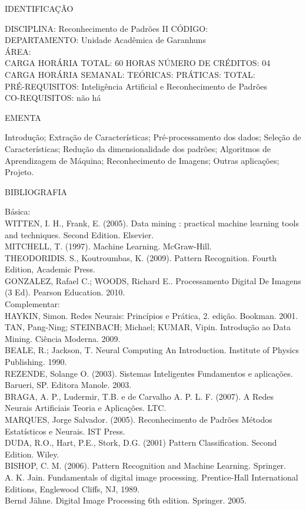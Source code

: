 \documentclass[
	12pt,				%
	openright,			%
  oneside,     %
	a4paper,			%
	chapter=TITLE,		%
	english,			%
	french,				%
	spanish,			%
	brazil				%
	]{abntex2}
\begin{document}
\begin{apendicesenv}
\newpage IDENTIFICAÇÃO

DISCIPLINA: Reconhecimento de Padrões II CÓDIGO:\\ 
DEPARTAMENTO: Unidade Acadêmica de Garanhuns\\
ÁREA: \\
CARGA HORÁRIA TOTAL: 60 HORAS NÚMERO DE CRÉDITOS: 04\\
CARGA HORÁRIA SEMANAL: TEÓRICAS: PRÁTICAS: TOTAL: \\
PRÉ-REQUISITOS: Inteligência Artificial e Reconhecimento de Padrões\\
CO-REQUISITOS: não há

EMENTA 

Introdução; Extração de Características; Pré-processamento dos dados; Seleção de Características; Redução da dimensionalidade dos padrões; Algoritmos de Aprendizagem de Máquina; Reconhecimento de Imagens; Outras aplicações; Projeto.

BIBLIOGRAFIA 

Básica:\\
WITTEN, I. H., Frank, E. (2005). Data mining : practical machine
learning tools and techniques. Second Edition. Elsevier.\\
MITCHELL, T. (1997). Machine Learning. McGraw-Hill.\\
THEODORIDIS. S., Koutroumbas, K. (2009). Pattern Recognition. Fourth
Edition, Academic Press.\\
GONZALEZ, Rafael C.; WOODS, Richard E.. Processamento Digital De Imagens
(3 Ed). Pearson Education. 2010.\\
Complementar:\\
HAYKIN, Simon. Redes Neurais: Princípios e Prática, 2. edição. Bookman.
2001.\\
TAN, Pang-Ning; STEINBACH; Michael; KUMAR, Vipin. Introdução ao Data
Mining. Ciência Moderna. 2009.\\
BEALE, R.; Jackson, T. Neural Computing  An Introduction. Institute
of Physics Publishing. 1990.\\
REZENDE, Solange O. (2003). Sistemas Inteligentes  Fundamentos e
aplicações. Barueri, SP. Editora Manole. 2003.\\
BRAGA, A. P., Ludermir, T.B. e de Carvalho A. P. L. F. (2007). A Redes
Neurais Artificiais  Teoria e Aplicações. LTC.\\
MARQUES, Jorge Salvador. (2005). Reconhecimento de Padrões  Métodos
Estatísticos e Neurais. IST Press.\\
DUDA, R.O., Hart, P.E., Stork, D.G. (2001) Pattern Classification.
Second Edition. Wiley.\\
BISHOP, C. M. (2006). Pattern Recognition and Machine Learning.
Springer.\\
A. K. Jain. Fundamentals of digital image processing. Prentice-Hall
International Editions, Englewood Cliffs, NJ, 1989.\\
Bernd Jähne. Digital Image Processing 6th edition. Springer. 2005.


\end{apendicesenv}
\end{document}
